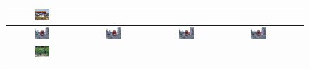 \documentclass[10pt,twocolumn,letterpaper]{article}
\begin{document}
\begin{figure}[h]
\begin{tabular}{|c|c|c|c|c|}
  \includegraphics[width=0.24\textwidth]{car_cnn/2e.png}  \\  
   \hline
  \includegraphics[width=0.24\textwidth]{car_cnn/4a.png} &   
  \includegraphics[width=0.24\textwidth]{car_cnn/4b.png} &   
  \includegraphics[width=0.24\textwidth]{car_cnn/4c.png} &   
  \includegraphics[width=0.24\textwidth]{car_cnn/4d.png}  \\  
  \hline
  \includegraphics[width=0.24\textwidth]{bicycle_cnn/7a.png} &   

\end{tabular}
\end{figure}
\end{document}
